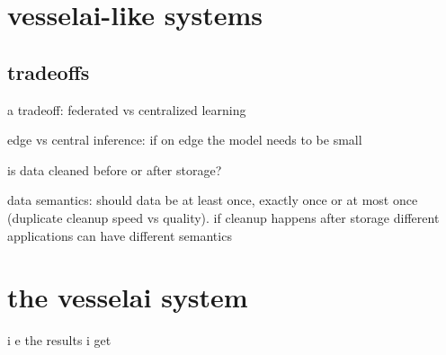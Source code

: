 \chapter{vesselai-like systems}

\section{tradeoffs}

a tradeoff: federated vs centralized learning \cite{iotsurvey}

edge vs central inference: if on edge the model needs to be small \cite{iotsurvey}

is data cleaned before or after storage?

data semantics: should data be at least once, exactly once or at most once (duplicate cleanup speed vs quality). if cleanup happens after storage different applications can have different semantics

\chapter{the vesselai system}

i e the results i get






